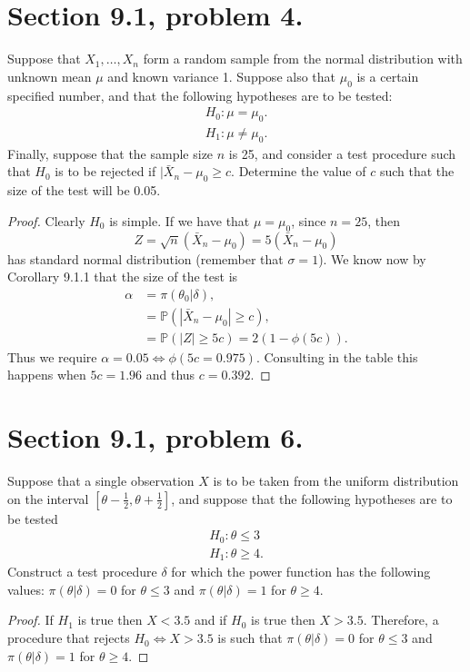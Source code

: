 \documentclass{article}
\renewcommand{\P}[1]{\mathbb{P}\left(#1\right)}
\newcommand{\randsamp}{X_1,\dots,X_n}
\newenvironment{hwproof}[1]
{
    #1
    \begin{proof}
}{
    \end{proof}
}
\begin{document}
\section{Section 9.1, problem 4.}
\begin{hwproof}
    {
        Suppose that $\randsamp$ form a random sample from the normal distribution
        with unknown mean $\mu$ and known variance 1. Suppose also that $\mu_0$
        is a certain specified number, and that the following hypotheses are to be
        tested:
        \begin{gather*}
            H_0: \mu = \mu_0.\\
            H_1: \mu \neq \mu_0.
        \end{gather*}
        Finally, suppose that the sample size $n$ is 25, and consider a test procedure
        such that $H_0$ is to be rejected if $|\bar{X}_n - \mu_0 \geq c$.
        Determine the value of $c$ such that the size of the test will be 0.05.
    }
    Clearly $H_0$ is simple. If we have that $\mu = \mu_0$, since $n = 25$, then
    \begin{equation*}
        Z = \sqrt{n}(\bar{X}_n - \mu_0) = 5(\bar{X}_n - \mu_0)
    \end{equation*}
    has standard normal distribution (remember that $\sigma = 1$). We know now
    by Corollary 9.1.1 that the size of the test is
    \begin{align*}
        \alpha & = \pi(\theta_0 | \delta),            \\
               & = \P{|\bar{X}_n - \mu_0| \geq c},    \\
               & = \P{|Z| \geq 5c} = 2(1 - \phi(5c)).
    \end{align*}
    Thus we require $\alpha = 0.05 \iff \phi(5c = 0.975)$.
    Consulting in the table this happens when $5c = 1.96$ and thus
    $c = 0.392$.
\end{hwproof}


\section{Section 9.1, problem 6.}
\begin{hwproof}
    {
        Suppose that a single observation $X$ is to be taken from the
        uniform distribution on the interval
        $\left[\theta - \frac{1}{2}, \theta + \frac{1}{2}\right]$, and suppose
        that the following hypotheses are to be tested
        \begin{gather*}
            H_0: \theta \leq 3\\
            H_1: \theta \geq 4.
        \end{gather*}
        Construct a test procedure $\delta$ for which the power function has the
        following values: $\pi(\theta | \delta) = 0$ for $\theta \leq 3$ and
        $\pi(\theta | \delta) = 1$ for $\theta \geq 4$.
    }

    If $H_1$ is true then $X < 3.5$ and if $H_0$ is true then $X > 3.5$.
    Therefore, a procedure that rejects $H_0 \iff X > 3.5$ is such that
    $\pi(\theta | \delta) = 0$ for $\theta \leq 3$ and $\pi(\theta | \delta) = 1$
    for $\theta \geq 4$.
\end{hwproof}
\end{document}
